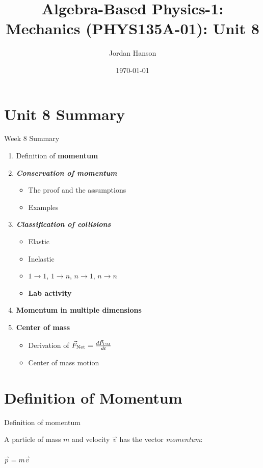 \documentclass{beamer}
\title{Algebra-Based Physics-1: Mechanics (PHYS135A-01): Unit 8}
\date{\today}
\author{Jordan Hanson}
\institute{Whittier College Department of Physics and Astronomy}
\begin{document}
\maketitle

\section{Unit 8 Summary}

\begin{frame}{Week 8 Summary}
\begin{enumerate}
\item Definition of \alert{\textbf{momentum}}
\item \alert{\textbf{\textit{Conservation of momentum}}}
\begin{itemize}
\item The proof and the assumptions
\item Examples
\end{itemize}
\item \alert{\textbf{\textit{Classification of collisions}}}
\begin{itemize}
\item Elastic
\item Inelastic
\item $1 \rightarrow 1$, $1 \rightarrow n$, $n \rightarrow 1$, $n \rightarrow n$
\item \textbf{Lab activity}
\end{itemize}
\item \textbf{Momentum in multiple dimensions}
\item \textbf{Center of mass}
\begin{itemize}
\item Derivation of $\vec{F}_{\rm Net} = \frac{d\vec{P}_{\rm CM}}{dt}$
\item Center of mass motion
\end{itemize}
\end{enumerate}
\end{frame}

\section{Definition of Momentum}

\begin{frame}{Definition of momentum}
\begin{tcolorbox}[colback=white,colframe=red!40!blue,title=Definition of Momentum]
\alert{A particle of mass $m$ and velocity $\vec{v}$ has the vector \textit{momentum}:} \\ \\
\alert{$\vec{p} = m\vec{v}$}
\end{tcolorbox}
\end{frame}
\end{document}
